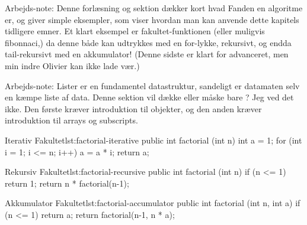 	\begin{remark}  Arbejds-note:
		Denne forlæsning og sektion dækker kort hvad Fanden en algoritme er, og
		giver simple eksempler, som viser hvordan man kan anvende dette kapitels
		tidligere emner.
		Et klart eksempel er fakultet-funktionen (eller muligvis fibonnaci,)
		da denne både kan udtrykkes med en for-lykke, rekursivt, og endda
		tail-rekursivt med en akkumulator! (Denne sidste er klart for
		advanceret, men min indre Olivier kan ikke lade vær.)
	\end{remark}

	\begin{remark}  Arbejds-note:
		Lister er en fundamentel datastruktur, sandeligt er datamaten selv en
		kæmpe liste af data.
		Denne sektion vil dække  eller måske bare
		? Jeg ved det ikke. Den første kræver introduktion til
		objekter, og den anden kræver introduktion til arrays og subscripts.
	\end{remark}


	\begin{JavaCode}{Iterativ Fakultet}{lst:factorial-iterative}
public int factorial (int n) {
	int a = 1;
	for (int i = 1; i <= n; i++)
		a = a * i;
	return a;
}
	\end{JavaCode}

	\begin{JavaCode}{Rekursiv Fakultet}{lst:factorial-recursive}
public int factorial (int n) {
	if (n <= 1)  return 1;
	return n * factorial(n-1);
}
	\end{JavaCode}

	\begin{JavaCode}{Akkumulator Fakultet}{lst:factorial-accumulator}
public int factorial (int n, int a) {
	if (n <= 1)  return a;
	return factorial(n-1, n * a);
}
	\end{JavaCode}


\blindtext
